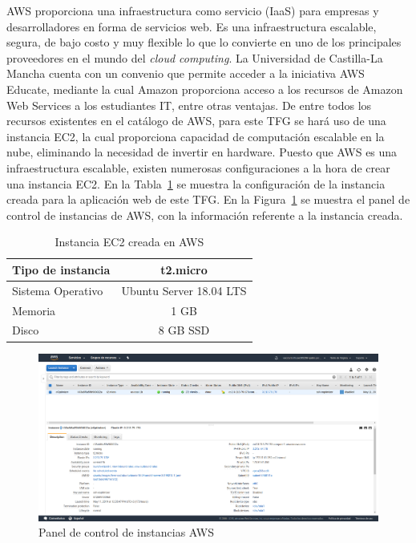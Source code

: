 \gls{AWS} proporciona una infraestructura como servicio (\gls{IaaS}) para empresas y desarrolladores en forma de servicios web. Es una infraestructura escalable, segura, de bajo costo y muy flexible lo que lo convierte en uno de los principales proveedores en el mundo del \textit{cloud computing}. La Universidad de Castilla-La Mancha cuenta con un convenio que permite acceder a la iniciativa AWS Educate, mediante la cual Amazon proporciona acceso a los recursos de Amazon Web Services a los estudiantes IT, entre otras ventajas. De entre todos los recursos existentes en el catálogo de \gls{AWS}, para este \gls{TFG} se hará uso de una instancia \gls{EC2}, la cual proporciona capacidad de computación escalable en la nube, eliminando la necesidad de invertir en hardware. Puesto que \gls{AWS} es una infraestructura escalable, existen numerosas configuraciones a la hora de crear una instancia \gls{EC2}. En la Tabla~\ref{tab:EC2instance} se muestra la configuración de la instancia creada para la aplicación web de este \gls{TFG}. En la Figura~\ref{fig:AWSControlPanel} se muestra el panel de control de instancias de \gls{AWS}, con la información referente a la instancia creada.
\begin{table}[hp]
        \centering
        \begin{tabular}{|l|c|}
                \hline
                Tipo de instancia & t2.micro \\ \hline
                Sistema Operativo & Ubuntu Server 18.04 LTS \\ \hline
                Memoria & 1 GB \\ \hline
                Disco & 8 GB SSD \\ \hline
             \end{tabular}
        \caption{Instancia EC2 creada en AWS}
        \label{tab:EC2instance}
\end{table}

\begin{figure}[H]
            \centering
            \includegraphics[width=17cm]{figs/aws_control_panel.png}
            \caption{Panel de control de instancias AWS}
            \label{fig:AWSControlPanel}
\end{figure}

